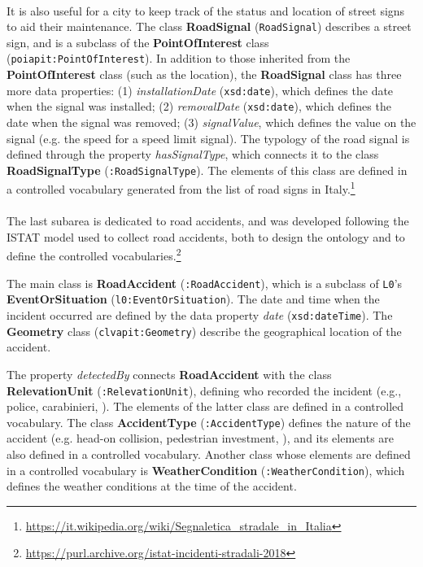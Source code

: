 \paragraph*{}
It is also useful for a city to keep track of the status and location of street signs to aid their maintenance. The class \textbf{RoadSignal} (\verb#RoadSignal#) describes a street sign, and is a subclass of the \textbf{PointOfInterest} class (\verb#poiapit:PointOfInterest#). In addition to those inherited from the \textbf{PointOfInterest} class (such as the location), the \textbf{RoadSignal} class has three more data properties: (1) \textit{installationDate} (\verb#xsd:date#), which defines the date when the signal was installed; (2) \textit{removalDate} (\verb#xsd:date#), which defines the date when the signal was removed; (3) \textit{signalValue}, which defines the value on the signal (e.g. the speed for a speed limit signal). The typology of the road signal is defined through the property \textit{hasSignalType}, which connects it to the class \textbf{RoadSignalType} (\verb#:RoadSignalType#). The elements of this class are defined in a controlled vocabulary generated from the list of road signs in Italy.\footnote{\url{https://it.wikipedia.org/wiki/Segnaletica_stradale_in_Italia}}

\paragraph*{}
The last subarea is dedicated to road accidents, and was developed following the ISTAT model used to collect road accidents, both to design the ontology and to define the controlled vocabularies.\footnote{\url{https://purl.archive.org/istat-incidenti-stradali-2018}}

The main class is \textbf{RoadAccident} (\verb#:RoadAccident#), which is a subclass of \verb#L0#'s \textbf{EventOrSituation} (\verb#l0:EventOrSituation#). The date and time when the incident occurred are defined by the data property \textit{date} (\verb#xsd:dateTime#). The \textbf{Geometry} class (\verb#clvapit:Geometry#) describe the geographical location of the accident.

The property \textit{detectedBy} connects \textbf{RoadAccident} with the class \textbf{RelevationUnit} (\verb#:RelevationUnit#), defining who recorded the incident (e.g., police, carabinieri, \etc). The elements of the latter class are defined in a controlled vocabulary. The class \textbf{AccidentType} (\verb#:AccidentType#) defines the nature of the accident (e.g. head-on collision, pedestrian investment, \etc), and its elements are also defined in a controlled vocabulary. Another class whose elements are defined in a controlled vocabulary is \textbf{WeatherCondition} (\verb#:WeatherCondition#), which defines the weather conditions at the time of the accident.

